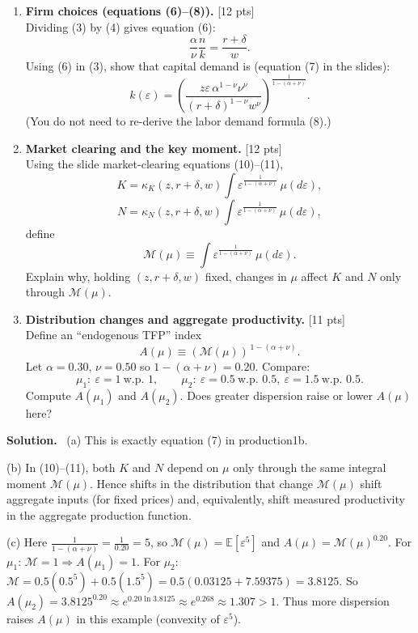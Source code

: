 \documentclass[12pt]{article}
\newenvironment{sol}{\par\medskip\noindent\textbf{Solution.}\ }{\par\medskip}
\newcommand{\pts}[1]{\hfill{\small[#1 pts]}}
\newcommand{\E}{\mathbb{E}}
\begin{document}
\begin{enumerate}[label=(\alph*)]
\item \textbf{Firm choices (equations (6)--(8)).} \pts{12}\\
Dividing (3) by (4) gives equation (6):
\[
\frac{\alpha}{\nu}\frac{n}{k}=\frac{r+\delta}{w}.
\tag{6}
\]
Using (6) in (3), show that capital demand is (equation (7) in the slides):
\[
k(\varepsilon)=
\left(
\frac{z\varepsilon\,\alpha^{1-\nu}\nu^{\nu}}{(r+\delta)^{1-\nu}w^{\nu}}
\right)^{\frac{1}{1-(\alpha+\nu)}}.
\tag{7}
\]
(You do not need to re-derive the labor demand formula (8).)

\item \textbf{Market clearing and the key moment.} \pts{12}\\
Using the slide market-clearing equations (10)--(11),
\[
K = \kappa_K(z,r+\delta,w)\int \varepsilon^{\frac{1}{1-(\alpha+\nu)}}\,\mu(d\varepsilon),
\tag{10}
\]
\[
N = \kappa_N(z,r+\delta,w)\int \varepsilon^{\frac{1}{1-(\alpha+\nu)}}\,\mu(d\varepsilon),
\tag{11}
\]
define
\[
\mathcal{M}(\mu)\equiv \int \varepsilon^{\frac{1}{1-(\alpha+\nu)}}\,\mu(d\varepsilon).
\]
Explain why, holding \((z,r+\delta,w)\) fixed, changes in \(\mu\) affect \(K\) and \(N\) only through \(\mathcal{M}(\mu)\).

\item \textbf{Distribution changes and aggregate productivity.} \pts{11}\\
Define an ``endogenous TFP'' index
\[
A(\mu)\equiv \left(\mathcal{M}(\mu)\right)^{\,1-(\alpha+\nu)}.
\]
Let \(\alpha=0.30\), \(\nu=0.50\) so \(1-(\alpha+\nu)=0.20\). Compare:
\[
\mu_1:\ \varepsilon=1\ \text{w.p. }1,
\qquad
\mu_2:\ \varepsilon=0.5\ \text{w.p. }0.5,\ \varepsilon=1.5\ \text{w.p. }0.5.
\]
Compute \(A(\mu_1)\) and \(A(\mu_2)\). Does greater dispersion raise or lower \(A(\mu)\) here?
\end{enumerate}

\begin{sol}
(a) This is exactly equation (7) in production1b.

(b) In (10)--(11), both \(K\) and \(N\) depend on \(\mu\) only through the same integral moment \(\mathcal{M}(\mu)\).
Hence shifts in the distribution that change \(\mathcal{M}(\mu)\) shift aggregate inputs (for fixed prices) and, equivalently,
shift measured productivity in the aggregate production function.

(c) Here \(\frac{1}{1-(\alpha+\nu)}=\frac{1}{0.20}=5\), so \(\mathcal{M}(\mu)=\E[\varepsilon^5]\) and \(A(\mu)=\mathcal{M}(\mu)^{0.20}\).
For \(\mu_1\): \(\mathcal{M}=1\Rightarrow A(\mu_1)=1\).
For \(\mu_2\): \(\mathcal{M}=0.5(0.5^5)+0.5(1.5^5)=0.5(0.03125+7.59375)=3.8125\).
So \(A(\mu_2)=3.8125^{0.20}\approx e^{0.20\ln 3.8125}\approx e^{0.268}\approx 1.307>1\).
Thus more dispersion raises \(A(\mu)\) in this example (convexity of \(\varepsilon^5\)).
\end{sol}
\end{document}
